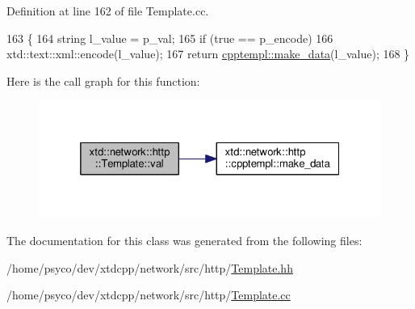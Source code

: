 Definition at line 162 of file Template.\+cc.


\begin{DoxyCode}
163 \{
164   \textcolor{keywordtype}{string} l\_value = p\_val;
165   \textcolor{keywordflow}{if} (\textcolor{keyword}{true} == p\_encode)
166     xtd::text::xml::encode(l\_value);
167   \textcolor{keywordflow}{return} \hyperlink{namespacextd_1_1network_1_1http_1_1cpptempl_a32fe5ec0914372b09492647a168dbbcb}{cpptempl::make\_data}(l\_value);
168 \}
\end{DoxyCode}


Here is the call graph for this function\+:
\nopagebreak
\begin{figure}[H]
\begin{center}
\leavevmode
\includegraphics[width=325pt]{classxtd_1_1network_1_1http_1_1Template_a3a96743542ae1a063e90ec3ec2e774f8_cgraph}
\end{center}
\end{figure}




The documentation for this class was generated from the following files\+:\begin{DoxyCompactItemize}
\item 
/home/psyco/dev/xtdcpp/network/src/http/\hyperlink{Template_8hh}{Template.\+hh}\item 
/home/psyco/dev/xtdcpp/network/src/http/\hyperlink{Template_8cc}{Template.\+cc}\end{DoxyCompactItemize}
